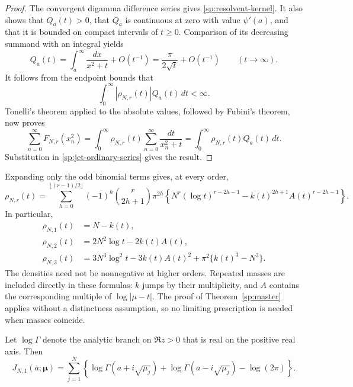 \begin{proof}
The convergent digamma difference series gives
\eqref{sp:resolvent-kernel}.  It also shows that $Q_a(t)>0$,
that $Q_a$ is continuous at zero with value $\psi'(a)$, and that
it is bounded on compact intervals of $t\geq0$.
Comparison of its decreasing summand with an integral yields
\[
 Q_a(t)=\int_a^{\infty}\frac{dx}{x^2+t}+O(t^{-1})
       =\frac{\pi}{2\sqrt t}+O(t^{-1})
       \qquad(t\to\infty).
\]
It follows from the endpoint bounds that
\[
 \int_0^{\infty}|\rho_{N,r}(t)|Q_a(t)\,dt<\infty.
\]
Tonelli's theorem applied to the absolute values, followed by
Fubini's theorem, now proves
\[
 \sum_{n=0}^{\infty}F_{N,r}(x_n^2)
   =\int_0^{\infty}\rho_{N,r}(t)
                     \sum_{n=0}^{\infty}\frac{dt}{x_n^2+t}
   =\int_0^{\infty}\rho_{N,r}(t)Q_a(t)\,dt.
\]
Substitution in \eqref{sp:jet-ordinary-series} gives the result.
\end{proof}

\begin{remark}
\label{sp:explicit-densities}
Expanding only the odd binomial terms gives, at every order,
\begin{equation}
 \rho_{N,r}(t)=
 \sum_{h=0}^{\lfloor(r-1)/2\rfloor}
   (-1)^h\binom{r}{2h+1}\pi^{2h}
   \left\{N^r(\log t)^{r-2h-1}
                -k(t)^{2h+1}A(t)^{r-2h-1}\right\}.
 \label{sp:binomial-density}
\end{equation}
In particular,
\begin{align}
 \rho_{N,1}(t)&=N-k(t),\label{sp:density-one}\\
 \rho_{N,2}(t)&=2N^2\log t-2k(t)A(t),\label{sp:density-two}\\
 \rho_{N,3}(t)&=3N^3\log^2t-3k(t)A(t)^2
                    +\pi^2\{k(t)^3-N^3\}.
 \label{sp:density-three}
\end{align}
The densities need not be nonnegative at higher orders.
Repeated masses are included directly in these formulas: $k$
jumps by their multiplicity, and $A$ contains the corresponding
multiple of $\log|\mu-t|$.  The proof of
Theorem~\ref{sp:master} applies without a distinctness assumption,
so no limiting prescription is needed when masses coincide.
\end{remark}

\begin{corollary}
\label{sp:first-jet}
Let $\log\Gamma$ denote the analytic branch on $\Re z>0$ that
is real on the positive real axis.  Then
\begin{equation}
 J_{N,1}(a;\boldsymbol\mu)
 =\sum_{j=1}^{N}\left\{
       \log\Gamma(a+i\sqrt{\mu_j})
       +\log\Gamma(a-i\sqrt{\mu_j})-\log(2\pi)\right\}.
 \label{sp:first-jet-gamma}
\end{equation}
\end{corollary}

